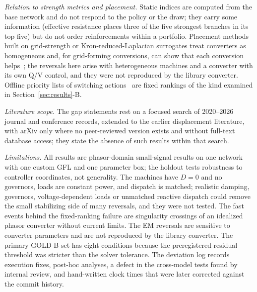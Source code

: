 \documentclass[journal]{IEEEtran}
\theoremstyle{remark}
\begin{document}
\emph{Relation to strength metrics and placement.} Static indices are
computed from the base network and do not respond to the policy or the draw; they
carry some information (effective resistance places three of the five strongest
branches in its top five) but do not order reinforcements within a portfolio.
Placement methods built on grid-strength or Kron-reduced-Laplacian surrogates
treat converters as homogeneous and, for grid-forming conversions, can show that
each conversion helps~\cite{yang2021gfm,xin2025howmany,huang2022gridstructure};
the reversals here arise with heterogeneous machines and a converter with its own
Q/V control, and they were not reproduced by the library converter. Offline
priority lists of switching actions~\cite{khaji2017switching} are fixed rankings
of the kind examined in Section~\ref{sec:results}-B.

\emph{Literature scope.} The gap statements rest on a focused search of
2020--2026 journal and conference records, extended to the earlier displacement
literature, with arXiv only where no peer-reviewed version exists and without
full-text database access; they state the absence of such results within that
search.

\emph{Limitations.} All results are phasor-domain small-signal results on one
network with one custom GFL and one parameter box; the holdout tests robustness to
controller coordinates, not generality. The machines have $D=0$ and no governors,
loads are constant power, and dispatch is matched; realistic damping, governors,
voltage-dependent loads or unmatched reactive dispatch could remove the small
stabilizing side of many reversals, and they were not tested. The fast events
behind the fixed-ranking failure are singularity crossings of an idealized phasor
converter without current limits. The EM reversals are sensitive to converter
parameters and are not reproduced by the library converter. The primary GOLD-B set
has eight conditions because the preregistered residual threshold was stricter than
the solver tolerance. The deviation log records execution fixes, post-hoc
analyses, a defect in the cross-model tests found by internal review, and hand-written
clock times that were later corrected against the commit history.

\end{document}
